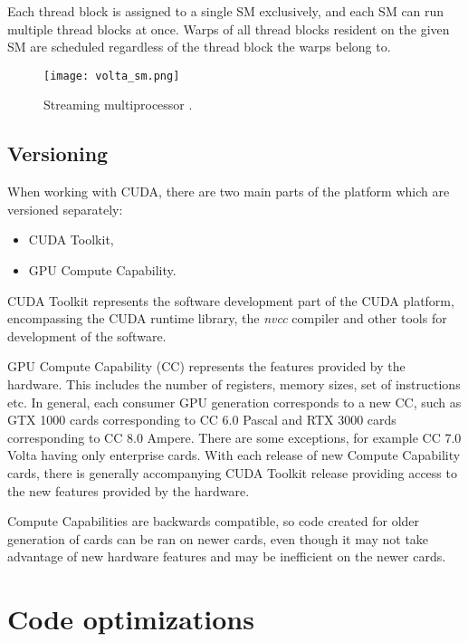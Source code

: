 Each thread block is assigned to a single SM exclusively, and each SM can run multiple thread blocks at once. Warps of all thread blocks resident on the given SM are scheduled regardless of the thread block the warps belong to.


\begin{figure}[ht]
	\centering
	\texttt{[image: volta\_sm.png]}
	\caption{Streaming multiprocessor \citep{paper:volta}.}
	\label{fig:volta_sm}
\end{figure}

\subsection{Versioning}

When working with CUDA, there are two main parts of the platform which are versioned separately: %
\begin{itemize}
	\item CUDA Toolkit,
	\item GPU Compute Capability.
\end{itemize}

CUDA Toolkit represents the software development part of the CUDA platform, encompassing the CUDA runtime library, the \textit{nvcc} compiler and other tools for development of the software.

GPU Compute Capability (CC) represents the features provided by the hardware. This includes the number of registers, memory sizes, set of instructions etc. In general, each consumer GPU generation corresponds to a new CC, such as GTX 1000 cards corresponding to CC 6.0 Pascal and RTX 3000 cards corresponding to CC 8.0 Ampere. There are some exceptions, for example CC 7.0 Volta having only enterprise cards. With each release of new Compute Capability cards, there is generally accompanying CUDA Toolkit release providing access to the new features provided by the hardware. 

Compute Capabilities are backwards compatible, so code created for older generation of cards can be ran on newer cards, even though it may not take advantage of new hardware features and may be inefficient on the newer cards.

\section{Code optimizations}


